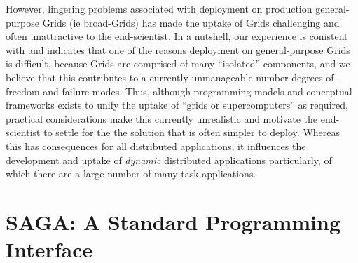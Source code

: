 \documentclass{llncs}
\begin{document}




However, lingering problems associated with deployment on production
general-purpose Grids (ie broad-Grids) has made the uptake of Grids
challenging and often unattractive to the end-scientist. In a
nutshell, our experience is conistent with and indicates that one of
the reasons deployment on general-purpose Grids is difficult, because
Grids are comprised of many ``isolated'' components, and we believe
that this contributes to a currently unmanageable number
degrees-of-freedom and failure modes.  Thus, although programming
models and conceptual frameworks exists to unify the uptake of ``grids
or supercomputers'' as required, practical considerations make this
currently unrealistic and motivate the end-scientist to settle for the
the solution that is often simpler to deploy. Whereas this has
consequences for all distributed applications, it influences the
development and uptake of {\it dynamic} distributed applications
particularly, of which there are a large number of many-task
applications.



\up

\section{SAGA: A Standard Programming Interface}
\end{document}
